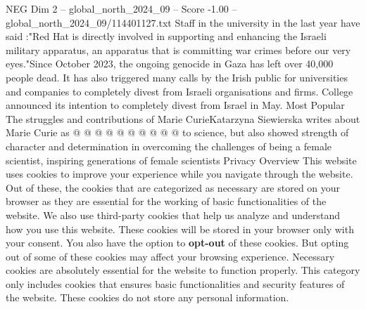 \begin{textsample}{NEG Dim 2 – global\_north\_2024\_09 – Score -1.00 – global\_north\_2024\_09/114401127.txt}
Staff in the university in the last year have said :"Red Hat is directly involved in supporting and enhancing the Israeli military apparatus, an apparatus that is committing war crimes before our very eyes."Since October 2023, the ongoing genocide in Gaza has left over 40,000 people dead.
It has also triggered many calls by the Irish public for universities and companies to completely divest from Israeli organisations and firms.
College announced its intention to completely divest from Israel in May.
Most Popular The struggles and contributions of Marie CurieKatarzyna Siewierska writes about Marie Curie as @ @ @ @ @ @ @ @ @ @ to science, but also showed strength of character and determination in overcoming the challenges of being a female scientist, inspiring generations of female scientists Privacy Overview This website uses cookies to improve your experience while you navigate through the website.
Out of these, the cookies that are categorized as necessary are stored on your browser as they are essential for the working of basic functionalities of the website.
We also use third-party cookies that help us analyze and understand how you use this website.
These cookies will be stored in your browser only with your consent.
You also have the option to \textbf{opt-out} of these cookies.
But opting out of some of these cookies may affect your browsing experience.
Necessary cookies are absolutely essential for the website to function properly.
This category only includes cookies that ensures basic functionalities and security features of the website.
These cookies do not store any personal information.

\end{textsample}
